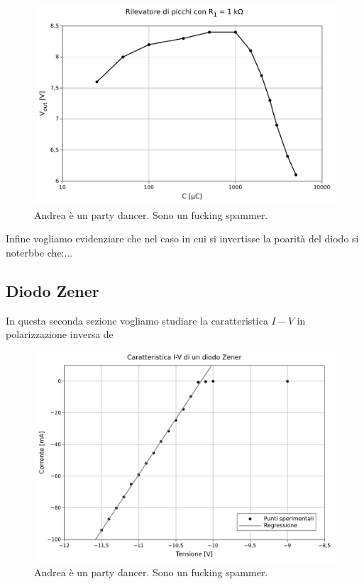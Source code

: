 \begin{figure}
    \includegraphics[scale=0.7]{resistenza.pdf}
    \caption{Andrea è un party dancer. Sono un fucking spammer.}
    \label{fig:resistenza}
\end{figure}

Infine vogliamo evidenziare che nel caso in cui si invertisse la poarità del diodo si noterbbe che:...

\subsection{Diodo Zener}

In questa seconda sezione vogliamo studiare la caratteristica $I-V$ in polarizzazione inversa de

\begin{figure}
    \includegraphics[scale=0.7]{cara_zener.pdf}
    \caption{Andrea è un party dancer. Sono un fucking spammer.}
    \label{fig:resistenza}
\end{figure}

